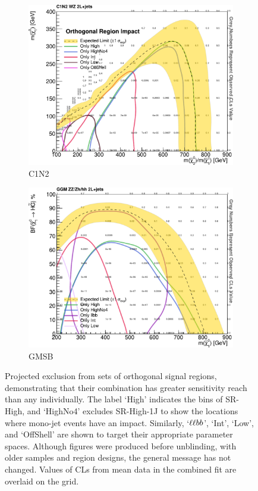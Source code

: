 \begin{figure}[tp]
\centering
\begin{subfigure}{0.48\textwidth}
\centering
\includegraphics[width=\textwidth]{figures/2ljets_fit_multi_contours_c1n2.pdf}
\caption{C1N2}
\end{subfigure}
\hfill
\begin{subfigure}{0.48\textwidth}
\centering
\includegraphics[width=\textwidth]{figures/2ljets_fit_multi_contours_gmsb.pdf}
\caption{GMSB}
\end{subfigure}
\caption[
Projected exclusion from sets of orthogonal signal regions
]{%
Projected exclusion from sets of orthogonal signal regions, demonstrating that
their combination has greater sensitivity reach than any individually.
The label `High' indicates the bins of SR-High, and `HighNo4' excludes
SR-High-1J to show the locations where mono-jet events have an impact.
Similarly, `$\ell\ell bb$', `Int', `Low', and `OffShell' are shown to target their
appropriate parameter spaces.
Although figures were produced before unblinding, with older samples and region
designs, the general message has not changed.
Values of CLs from mean data in the combined fit are overlaid on the grid.
}
\label{fig:2ljets_fit_muti_contourss}
\end{figure}
